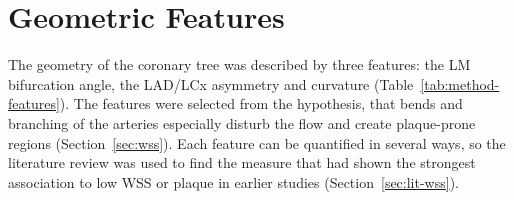 \providecommand{\clarify}[1]{\textcolor{red}{\textbf{Clarification needed:} #1}}
\section{Geometric Features}
\label{sec:method-features}

The geometry of the coronary tree was described by three features: the LM bifurcation angle, the LAD/LCx asymmetry and curvature (Table~\ref{tab:method-features}).
The features were selected from the hypothesis, that bends and branching of the arteries especially disturb the flow and create plaque-prone regions (Section~\ref{sec:wss}).
Each feature can be quantified in several ways, so the literature review was used to find the measure that had shown the strongest association to low WSS or plaque in earlier studies (Section~\ref{sec:lit-wss}).

